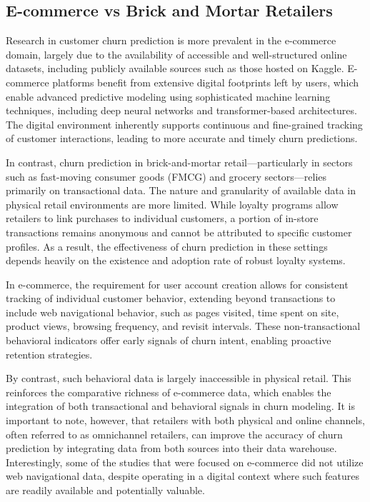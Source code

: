 \subsection{E-commerce vs Brick and Mortar Retailers}\nopagebreak
\noindent Research in customer churn prediction is more prevalent in the e-commerce domain, largely due to the availability of accessible and well-structured online datasets, including publicly available sources such as those hosted on Kaggle. E-commerce platforms benefit from extensive digital footprints left by users, which enable advanced predictive modeling using sophisticated machine learning techniques, including deep neural networks and transformer-based architectures. The digital environment inherently supports continuous and fine-grained tracking of customer interactions, leading to more accurate and timely churn predictions.

In contrast, churn prediction in brick-and-mortar retail---particularly in sectors such as fast-moving consumer goods (FMCG) and grocery sectors---relies primarily on transactional data. The nature and granularity of available data in physical retail environments are more limited. While loyalty programs allow retailers to link purchases to individual customers, a portion of in-store transactions remains anonymous and cannot be attributed to specific customer profiles. As a result, the effectiveness of churn prediction in these settings depends heavily on the existence and adoption rate of robust loyalty systems.

In e-commerce, the requirement for user account creation allows for consistent tracking of individual customer behavior, extending beyond transactions to include web navigational behavior, such as pages visited, time spent on site, product views, browsing frequency, and revisit intervals. These non-transactional behavioral indicators offer early signals of churn intent, enabling proactive retention strategies.

By contrast, such behavioral data is largely inaccessible in physical retail. This reinforces the comparative richness of e-commerce data, which enables the integration of both transactional and behavioral signals in churn modeling. 
It is important to note, however, that retailers with both physical and online channels, often referred to as omnichannel retailers, can improve the accuracy of churn prediction by integrating data from both sources into their data warehouse. 
Interestingly, some of the studies that were focused on e-commerce did not utilize web navigational data, despite operating in a digital context where such features are readily available and potentially valuable.


